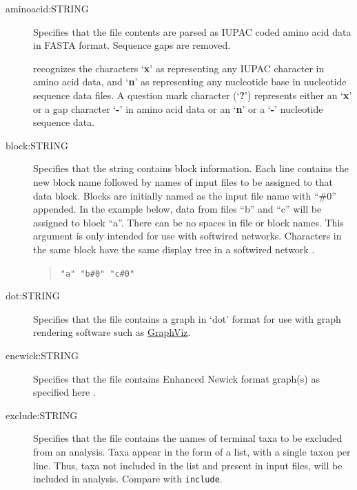 	\begin{description}
		\item [aminoacid:STRING] Specifies that the file contents are parsed as IUPAC coded amino 
		acid data in FASTA \citep{PearsonandLipman1988} format.  Sequence gaps are removed.

		\begin{tcolorbox}[enhanced,fit to height=3cm,
  		colback=JungleGreen!40!black!2!white,colframe=JungleGreen!70!black,title=Note,
  		drop fuzzy shadow]
  		\phyg recognizes the characters `\textbf{x}' as representing any IUPAC character in amino
		acid data, and `\textbf{n}' as representing any nucleotide base in nucleotide sequence
		data files. A question mark character (`\textbf{?}') represents either an `\textbf{x}'  or a 
		gap character `\textbf{-}' in amino acid data or an `\textbf{n}' or a `\textbf{-}' nucleotide
		sequence data.
		\end{tcolorbox}

		\item [block:STRING] Specifies that the string contains block information. Each line contains 
		the new block name followed by names of input files to be assigned to that data block. 
		Blocks are initially named as the input file name with ``\#0'' appended. In the example below, 
		data from files ``b'' and ``c'' will be assigned to block ``a''. There can be no spaces in 
		file or block names. This argument is only intended for use with softwired networks.
		Characters in the same block have the same display tree in a softwired network
		\citep{WheelerandWashburn2023}.
			
			\begin{quote}
			\texttt{"a" "b\#0" "c\#0"}
			\end{quote}
	
		\item [dot:STRING] Specifies that the file contains a graph in `dot' format for use with graph 
		rendering software such as \href{https://en.wikipedia.org/wiki/Graphviz}{GraphViz}.
			
		\item [enewick:STRING] Specifies that the file contains Enhanced Newick format graph(s) as
		specified here \citep{Cardonaetal2008}. 
			
		\item [exclude:STRING] Specifies that the file contains the names of terminal taxa to be 
		excluded from an analysis. Taxa appear in the form of a list, with a single taxon per 
		line. Thus, taxa not included in the list and present in input files, will be included in 
		analysis. Compare with \texttt{include}.
			

\end{description}
